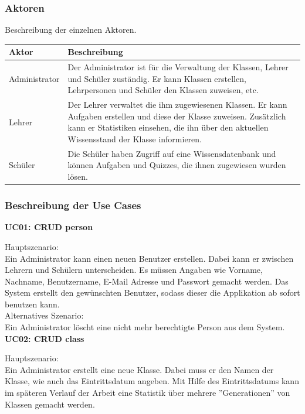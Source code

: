 \subsubsection{Aktoren}
Beschreibung der einzelnen Aktoren.
\newline
\begin{tabularx}{\textwidth}{| X | X |}
	\hline
		\textbf{Aktor} & \textbf{Beschreibung} \\
	\hline
		Administrator & Der Administrator ist für die Verwaltung der Klassen, Lehrer und Schüler zuständig. Er kann Klassen erstellen, Lehrpersonen und Schüler den Klassen zuweisen, etc. \\
	\hline
		Lehrer & Der Lehrer verwaltet die ihm zugewiesenen Klassen. Er kann Aufgaben erstellen und diese der Klasse zuweisen. Zusätzlich kann er Statistiken einsehen, die ihn über den aktuellen Wissensstand der Klasse informieren. \\
	\hline
		Schüler & Die Schüler haben Zugriff auf eine Wissensdatenbank und können Aufgaben und Quizzes, die ihnen zugewiesen wurden lösen. \\
	\hline
\end{tabularx}


\subsubsection{Beschreibung der Use Cases}
\textbf{UC01: CRUD person}

\noindent Hauptszenario: \\
Ein Administrator kann einen neuen Benutzer erstellen. Dabei kann er zwischen Lehrern und Schülern unterscheiden. Es müssen Angaben wie Vorname, Nachname, Benutzername, E-Mail Adresse und Passwort gemacht werden. Das System erstellt den gewünschten Benutzer, sodass dieser die Applikation ab sofort benutzen kann. \\

\noindent Alternatives Szenario: \\
Ein Administrator löscht eine nicht mehr berechtigte Person aus dem System. \\


\noindent \textbf{UC02: CRUD class}

\noindent Hauptszenario: \\
Ein Administrator erstellt eine neue Klasse. Dabei muss er den Namen der Klasse, wie auch das Eintrittsdatum angeben. Mit Hilfe des Eintrittsdatums kann im späteren Verlauf der Arbeit eine Statistik über mehrere ''Generationen'' von Klassen gemacht werden. \\

